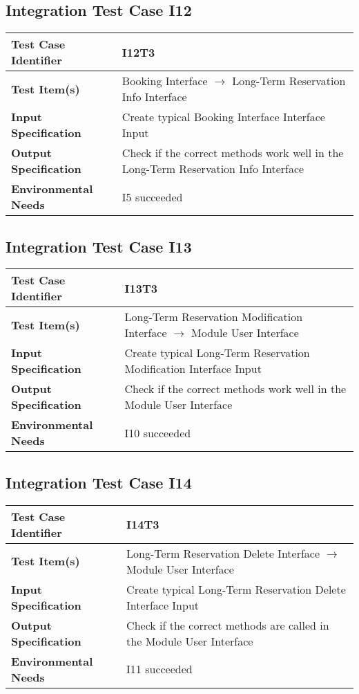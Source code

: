 \subsection{Integration Test Case I12}
\begin{tabular}{l p{9cm}}
	\hline
	\textbf{Test	Case Identifier} & I12T3 \\ \hline
	\textbf{Test	Item(s)} & Booking Interface $\rightarrow$ Long-Term Reservation Info Interface \\ \hline
	\textbf{Input Specification} & Create typical Booking Interface Interface Input\\ \hline
	\textbf{Output Specification} & Check if the correct methods work well in the Long-Term Reservation Info Interface \\ \hline
	\textbf{Environmental Needs} & I5 succeeded \\ \hline
\end{tabular}
\vspace{0.5cm}
\subsection{Integration Test Case I13}
\begin{tabular}{l p{9cm}}
	\hline
	\textbf{Test	Case Identifier} & I13T3 \\ \hline
	\textbf{Test	Item(s)} & Long-Term Reservation Modification Interface $\rightarrow$ Module User Interface \\ \hline
	\textbf{Input Specification} & Create typical Long-Term Reservation Modification Interface Input\\ \hline
	\textbf{Output Specification} & Check if the correct methods work well in the Module User Interface \\ \hline
	\textbf{Environmental Needs} & I10 succeeded \\ \hline
\end{tabular}
\vspace{0.5cm}
\subsection{Integration Test Case I14}
\begin{tabular}{l p{9cm}}
	\hline
	\textbf{Test	Case Identifier} & I14T3 \\ \hline
	\textbf{Test	Item(s)} & Long-Term Reservation Delete Interface $\rightarrow$ Module User Interface \\ \hline
	\textbf{Input Specification} & Create typical Long-Term Reservation Delete Interface Input\\ \hline
	\textbf{Output Specification} & Check if the correct methods are called in the Module User Interface \\ \hline
	\textbf{Environmental Needs} & I11 succeeded \\ \hline
\end{tabular}
\vspace{0.5cm}
